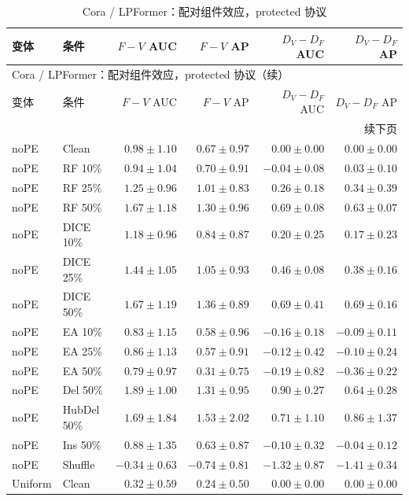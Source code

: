 {\footnotesize
\setlength{\tabcolsep}{3.2pt}
\renewcommand{\arraystretch}{1.10}
\begin{longtable}{llrrrr}
\caption{Cora / LPFormer：配对组件效应，protected 协议}\\
\toprule
变体 & 条件 & $F-V$ AUC & $F-V$ AP & $D_V-D_F$ AUC & $D_V-D_F$ AP \\
\midrule
\endfirsthead
\multicolumn{6}{l}{Cora / LPFormer：配对组件效应，protected 协议（续）}\\
\toprule
变体 & 条件 & $F-V$ AUC & $F-V$ AP & $D_V-D_F$ AUC & $D_V-D_F$ AP \\
\midrule
\endhead
\midrule\multicolumn{6}{r}{续下页}\\
\endfoot
\bottomrule
\endlastfoot
noPE & Clean & $0.98\pm1.10$ & $0.67\pm0.97$ & $0.00\pm0.00$ & $0.00\pm0.00$ \\
noPE & RF 10\% & $0.94\pm1.04$ & $0.70\pm0.91$ & $-0.04\pm0.08$ & $0.03\pm0.10$ \\
noPE & RF 25\% & $1.25\pm0.96$ & $1.01\pm0.83$ & $0.26\pm0.18$ & $0.34\pm0.39$ \\
noPE & RF 50\% & $1.67\pm1.18$ & $1.30\pm0.96$ & $0.69\pm0.08$ & $0.63\pm0.07$ \\
noPE & DICE 10\% & $1.18\pm0.96$ & $0.84\pm0.87$ & $0.20\pm0.25$ & $0.17\pm0.23$ \\
noPE & DICE 25\% & $1.44\pm1.05$ & $1.05\pm0.93$ & $0.46\pm0.08$ & $0.38\pm0.16$ \\
noPE & DICE 50\% & $1.67\pm1.19$ & $1.36\pm0.89$ & $0.69\pm0.41$ & $0.69\pm0.16$ \\
noPE & EA 10\% & $0.83\pm1.15$ & $0.58\pm0.96$ & $-0.16\pm0.18$ & $-0.09\pm0.11$ \\
noPE & EA 25\% & $0.86\pm1.13$ & $0.57\pm0.91$ & $-0.12\pm0.42$ & $-0.10\pm0.24$ \\
noPE & EA 50\% & $0.79\pm0.97$ & $0.31\pm0.75$ & $-0.19\pm0.82$ & $-0.36\pm0.22$ \\
noPE & Del 50\% & $1.89\pm1.00$ & $1.31\pm0.95$ & $0.90\pm0.27$ & $0.64\pm0.28$ \\
noPE & HubDel 50\% & $1.69\pm1.84$ & $1.53\pm2.02$ & $0.71\pm1.10$ & $0.86\pm1.37$ \\
noPE & Ins 50\% & $0.88\pm1.35$ & $0.63\pm0.87$ & $-0.10\pm0.32$ & $-0.04\pm0.12$ \\
noPE & Shuffle & $-0.34\pm0.63$ & $-0.74\pm0.81$ & $-1.32\pm0.87$ & $-1.41\pm0.34$ \\
Uniform & Clean & $0.32\pm0.59$ & $0.24\pm0.50$ & $0.00\pm0.00$ & $0.00\pm0.00$ \\

\end{longtable}}
